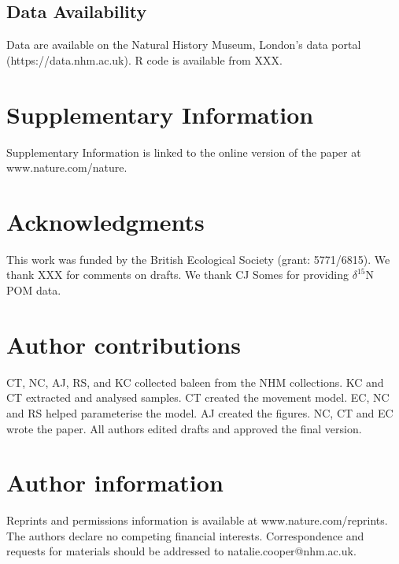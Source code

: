 \documentclass[a4paper,12pt]{article}
\begin{document}
\subsection{Data Availability}
Data are available on the Natural History Museum, London's data portal (https://data.nhm.ac.uk). 
R code is available from XXX.





\section{Supplementary Information}
Supplementary Information is linked to the online version of the paper at www.nature.com/nature.

\section{Acknowledgments}
This work was funded by the British Ecological Society (grant: 5771/6815). 
We thank XXX for comments on drafts.
We thank CJ Somes for providing  $\delta^{15}$N POM data.

\section{Author contributions}
CT, NC, AJ, RS, and KC collected baleen from the NHM collections. 
KC and CT extracted and analysed samples.
CT created the movement model.
EC, NC and RS helped parameterise the model.
AJ created the figures. 
NC, CT and EC wrote the paper.
All authors edited drafts and approved the final version.

\section{Author information}
Reprints and permissions information is available at www.nature.com/reprints.
The authors declare no competing financial interests.
Correspondence and requests for materials should be addressed to natalie.cooper@nhm.ac.uk.





\end{document}
